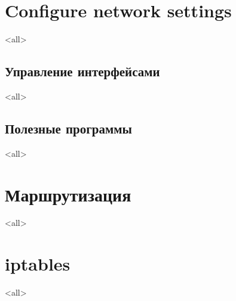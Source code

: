 \section{Configure network settings}
\mode<all>{}

\subsection{Управление интерфейсами}
\mode<all>{}

\subsection{Полезные программы}
\mode<all>{}


\section{Маршрутизация}
\mode<all>{}

\section{iptables}
\mode<all>{}


